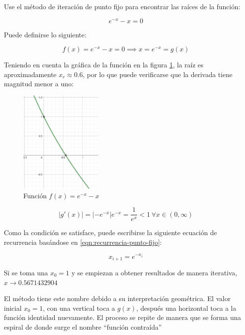 \begin{ex}
	Use el método de iteración de punto fijo para encontrar las raíces de la
	función:

	\[
		e^{-x} - x = 0
	\]

	\begin{solution}
		Puede definirse lo siguiente:

		\[
			f(x) = e^{-x} - x = 0 \implies x = e^{-x} = g(x)
		\]

        Teniendo en cuenta la gráfica de la función en la figura
        \ref{fig:ejercicio-punto-fijo}, la raíz es aproximadamente $x_r \approx
        0.6$, por lo que puede verificarse que la derivada tiene magnitud menor
        a uno:

		\begin{figure}
			\centering
			\includegraphics[height=2in]{img/punto-fijo-img.png}
			\caption{Función $f(x) = e^{-x} - x$}
            \label{fig:ejercicio-punto-fijo}
		\end{figure}

		\[
			|g'(x)| = |-e^{-x}| e^{-x} = \frac{1}{e^x} < 1\ \forall x \in (0,
			\infty)
		\]

        Como la condición se satisface, puede escribirse la siguiente ecuación
        de recurrencia basándose en \ref{eqn:recurrencia-punto-fijo}:

		\[
			x_{i+1} = e^{-x_i}
		\]

		Si se toma una $x_0 = 1$ y se empiezan a obtener resultados de
		manera iterativa, $x \rightarrow 0.5671432904$

	\end{solution}
\end{ex}

El método tiene este nombre debido a su interpretación geométrica. El valor
inicial $x_0 = 1$, con una vertical toca a $g(x)$, después una horizontal toca a
la función identidad nuevamente. El proceso se repite de manera que se forma una
espiral de donde surge el nombre ``función contraída''


